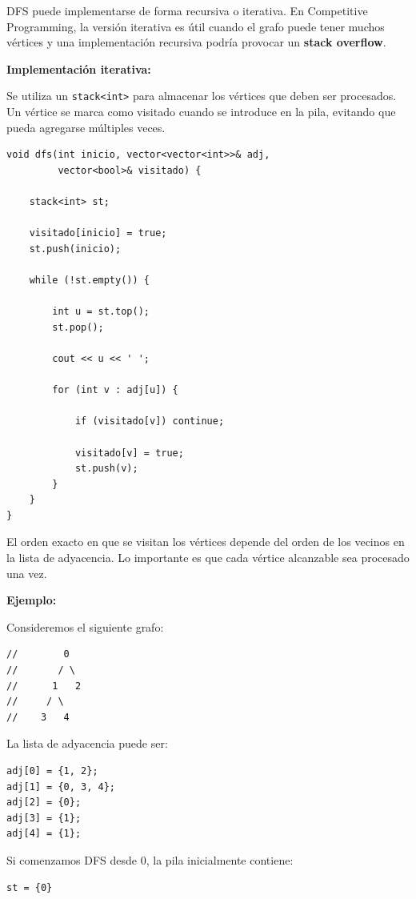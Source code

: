 \documentclass[10pt,a4paper,twocolumn]{article}
\begin{document}
DFS puede implementarse de forma recursiva o iterativa. En Competitive
Programming, la versión iterativa es útil cuando el grafo puede tener
muchos vértices y una implementación recursiva podría provocar un
\textbf{stack overflow}.

\textbf{Implementación iterativa:}

Se utiliza un \texttt{stack<int>} para almacenar los vértices que deben
ser procesados. Un vértice se marca como visitado cuando se introduce
en la pila, evitando que pueda agregarse múltiples veces.

\begin{lstlisting}[style=cpp]
void dfs(int inicio, vector<vector<int>>& adj,
         vector<bool>& visitado) {

    stack<int> st;

    visitado[inicio] = true;
    st.push(inicio);

    while (!st.empty()) {

        int u = st.top();
        st.pop();

        cout << u << ' ';

        for (int v : adj[u]) {

            if (visitado[v]) continue;

            visitado[v] = true;
            st.push(v);
        }
    }
}
\end{lstlisting}

El orden exacto en que se visitan los vértices depende del orden de los
vecinos en la lista de adyacencia. Lo importante es que cada vértice
alcanzable sea procesado una vez.

\textbf{Ejemplo:}

Consideremos el siguiente grafo:

\begin{lstlisting}[style=cpp]
//        0
//       / \
//      1   2
//     / \
//    3   4
\end{lstlisting}

La lista de adyacencia puede ser:

\begin{lstlisting}[style=cpp]
adj[0] = {1, 2};
adj[1] = {0, 3, 4};
adj[2] = {0};
adj[3] = {1};
adj[4] = {1};
\end{lstlisting}

Si comenzamos DFS desde $0$, la pila inicialmente contiene:

\begin{lstlisting}[style=cpp]
st = {0}
\end{lstlisting}
\end{document}
